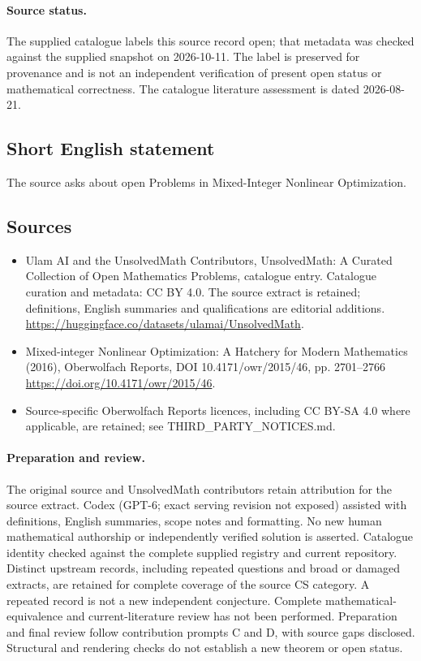 \documentclass[11pt]{article}
\begin{document}
\paragraph{Source status.}
The supplied catalogue labels this source record open; that metadata was checked against the supplied snapshot on 2026-10-11. The label is preserved for provenance and is not an independent verification of present open status or mathematical correctness. The catalogue literature assessment is dated 2026-08-21.
\subsection{Short English statement}
The source asks about open Problems in Mixed-Integer Nonlinear Optimization.
\subsection{Sources}
\begin{itemize}
\item[\hypertarget{source:statement:1}{S1}] Ulam AI and the UnsolvedMath Contributors, UnsolvedMath: A Curated Collection of Open Mathematics Problems, catalogue entry. Catalogue curation and metadata: CC BY 4.0. The source extract is retained; definitions, English summaries and qualifications are editorial additions.
\url{https://huggingface.co/datasets/ulamai/UnsolvedMath}.
\item[\hypertarget{source:statement:2}{S2}] Mixed-integer Nonlinear Optimization: A Hatchery for Modern Mathematics (2016), Oberwolfach Reports, DOI 10.4171/owr/2015/46, pp. 2701--2766
\url{https://doi.org/10.4171/owr/2015/46}.
\item Source-specific Oberwolfach Reports licences, including CC BY-SA 4.0 where applicable, are retained; see THIRD\_PARTY\_NOTICES.md.
\end{itemize}
\paragraph{Preparation and review.}
The original source and UnsolvedMath contributors retain attribution for the source extract. Codex (GPT-6; exact serving revision not exposed) assisted with definitions, English summaries, scope notes and formatting. No new human mathematical authorship or independently verified solution is asserted. Catalogue identity checked against the complete supplied registry and current repository. Distinct upstream records, including repeated questions and broad or damaged extracts, are retained for complete coverage of the source CS category. A repeated record is not a new independent conjecture. Complete mathematical-equivalence and current-literature review has not been performed. Preparation and final review follow contribution prompts C and D, with source gaps disclosed. Structural and rendering checks do not establish a new theorem or open status.
\label{end:statement}
\end{document}
